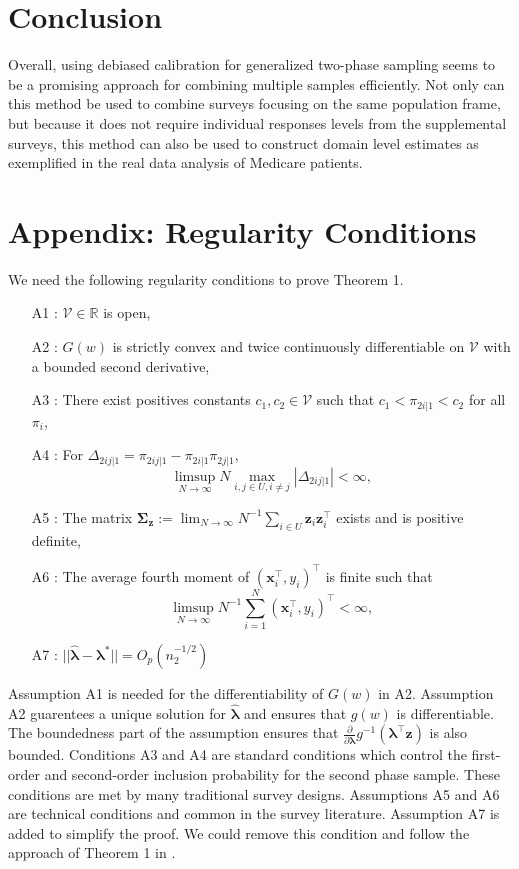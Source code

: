 \documentclass[12pt]{article}
\newcommand{\R}{\mathbb{R}}
\renewcommand{\bf}[1]{\mathbf{#1}}
\begin{document}
\section{Conclusion}

Overall, using debiased calibration for generalized two-phase sampling seems to
be a promising approach for combining multiple samples efficiently. Not only can
this method be used to combine surveys focusing on the same population frame,
but because it does not require individual responses levels from the
supplemental surveys, this method can also be used to construct domain level
estimates as exemplified in the real data analysis of Medicare patients.




\newpage
\appendix

\section{Appendix: Regularity Conditions}

We need the following regularity conditions to prove Theorem 1.

\begin{itemize}
  \item[A1]: $\mathcal{V} \in \R$ is open,
  \item[A2]: $G(w)$ is strictly convex and twice continuously differentiable on
    $\mathcal{V}$ with a bounded second derivative,
  \item[A3]: There exist positives constants $c_1, c_2 \in \mathcal{V}$ such
    that $c_1 < \pi_{2i|1} < c_2$ for all $\pi_i$,
  \item[A4]: For $\Delta_{2ij|1} = \pi_{2ij|1} - \pi_{2i|1}\pi_{2j|1}$,
    $$
    \limsup_{N \to \infty} N \max_{i, j \in U, i \neq j} |\Delta_{2ij|1}| <
    \infty,
    $$
  \item[A5]: The matrix $\bm \Sigma_{\bf z} := 
    \lim_{N \to \infty} N^{-1} \sum_{i \in U} {\bf z}_i {\bf z}_i^\top$ exists
    and is positive definite, 
  \item[A6]: The average fourth moment of $({\bf x}_i^\top, y_i)^\top$ is finite
    such that 
    $$
    \limsup_{N \to \infty} N^{-1} \sum_{i = 1}^N ({\bf x}_i^\top, y_i)^\top < \infty,
    $$
  \item[A7]: $||\hat{\bm \lambda} - \bm \lambda^*|| = O_p(n_2^{-1/2})$
\end{itemize}

Assumption A1 is needed for the differentiability of $G(w)$ in A2.
Assumption A2 guarentees a unique solution for $\hat{\bm \lambda}$ and ensures
that $g(w)$ is differentiable. The boundedness part of the assumption ensures
that $\frac{\partial}{\partial \bm \lambda} g^{-1}(\bm \lambda^\top {\bf z})$ is
also bounded. Conditions A3 and A4 are standard conditions which control the
first-order and second-order inclusion probability for the second phase sample.
These conditions are met by many traditional survey designs. Assumptions A5 and
A6 are technical conditions and common in the survey literature. Assumption A7
is added to simplify the proof. We could remove this condition and follow the
approach of Theorem 1 in \cite{kwon2024debiased}.
\end{document}
